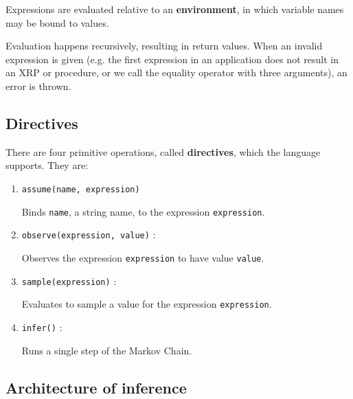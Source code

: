 \documentclass[11pt]{article}
\begin{document}
Expressions are evaluated relative to an {\bf environment}, in which variable names may be bound to values.  

Evaluation happens recursively, resulting in return values.  When an invalid expression is given (e.g. the first expression in an application does not result in an XRP or procedure, or we call the equality operator with three arguments), an error is thrown.  

\subsection{Directives}

There are four primitive operations, called {\bf directives}, which the language supports.  They are:

\begin{enumerate}
\item {\tt assume(name, expression)}

Binds {\tt name}, a string name, to the expression {\tt expression}.

\item {\tt observe(expression, value)} : 

Observes the expression {\tt expression} to have value {\tt value}.

\item {\tt sample(expression)} : 

Evaluates to sample a value for the expression {\tt expression}.

\item {\tt infer()} : 

Runs a single step of the Markov Chain.

\end{enumerate}





%

\subsection{Architecture of inference}
\end{document}
